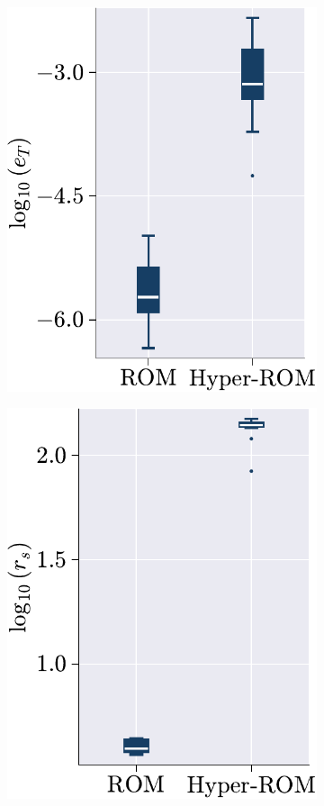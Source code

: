 \documentclass[11pt]{article}
\begin{document}
        \begin{figure}[t!]
            \centering
            \begin{subfigure}[b]{0.47\linewidth}
                \centering
                \includegraphics[height=0.95\linewidth]{error_comp_rom_hrom_deim.pdf}
                \caption{}
                \label{fig:HROM_ERROR_SPDUP_a_deim}
            \end{subfigure}\hfill
            \begin{subfigure}[b]{0.47\linewidth}
                \centering
                \includegraphics[height=0.95\linewidth]{speed_up_comp_rom_hrom_deim.pdf}

\end{subfigure}
\end{figure}
\end{document}
